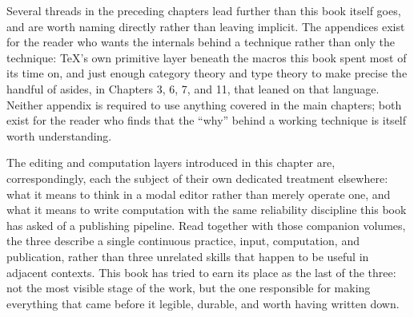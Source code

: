 Several threads in the preceding chapters lead further than this book itself goes, and are worth naming directly rather than leaving implicit. The appendices exist for the reader who wants the internals behind a technique rather than only the technique: TeX's own primitive layer beneath the macros this book spent most of its time on, and just enough category theory and type theory to make precise the handful of asides, in Chapters 3, 6, 7, and 11, that leaned on that language. Neither appendix is required to use anything covered in the main chapters; both exist for the reader who finds that the ``why'' behind a working technique is itself worth understanding.

The editing and computation layers introduced in this chapter are, correspondingly, each the subject of their own dedicated treatment elsewhere: what it means to think in a modal editor rather than merely operate one, and what it means to write computation with the same reliability discipline this book has asked of a publishing pipeline. Read together with those companion volumes, the three describe a single continuous practice, input, computation, and publication, rather than three unrelated skills that happen to be useful in adjacent contexts. This book has tried to earn its place as the last of the three: not the most visible stage of the work, but the one responsible for making everything that came before it legible, durable, and worth having written down.
